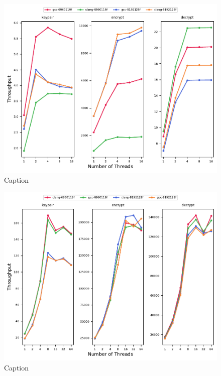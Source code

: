 \begin{figure}
    \centering
    \includegraphics{chapters/results/throughput/Old Mid-Range Laptop_mceliece.pdf}
    \caption{Caption}
    \label{figure:results:throughput:mceliece-old-mid-range-laptop}
\end{figure}

\begin{figure}
    \centering
    \includegraphics{chapters/results/throughput/Modern Workstation_mceliece.pdf}
    \caption{Caption}
    \label{figure:results:throughput:mceliece-modern-workstation}
\end{figure}

